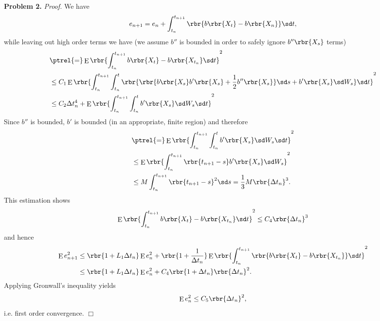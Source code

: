 \documentclass[english, nochinese]{pnote}
\DeclareMathOperator\ope{\mathrm{E}}
\begin{document}
\textbf{Problem 2.} \textit{Proof.} We have
\begin{equation}
e_{ n + 1 } = e_n + \int_{t_n}^{t_{ n + 1 }} \rbr{ b \rbr{X_t} - b \rbr{X_n} } \sd t,
\end{equation}
while leaving out high order terms we have (we assume $b''$ is bounded in order to safely ignore $ b'' \rbr{X_s} $ terms)
\begin{equation}
\begin{split}
&\ptrel{=} \ope \rbr{ \int_{t_n}^{t_{ n + 1 }} b \rbr{X_t} - b \rbr{X_{t_n}} \sd t }^2 \\
&\le C_1 \ope \rbr{ \int_{t_n}^{t_{ n + 1 }} \int_{t_n}^t \rbr{ \rbr{ b \rbr{X_s} b' \rbr{X_s} + \frac{1}{2} b'' \rbr{X_s} } \sd s + b' \rbr{X_s} \sd W_s } \sd t }^2 \\
&\le C_2 \Delta t_n^4 + \ope \rbr{ \int_{t_n}^{t_{ n + 1 }} \int_{t_n}^t b' \rbr{X_s} \sd W_s \sd t }^2
\end{split}
\end{equation}
Since $b''$ is bounded, $b'$ is bounded (in an appropriate, finite region) and therefore
\begin{equation}
\begin{split}
&\ptrel{=} \ope \rbr{ \int_{t_n}^{t_{ n + 1 }} \int_{t_n}^t b' \rbr{X_s} \sd W_s \sd t }^2 \\
&\le \ope \rbr{ \int_{t_n}^{t_{ n + 1 }} \rbr{ t_{ n + 1 } - s } b' \rbr{X_s} \sd W_s }^2 \\
&\le M \int_{t_n}^{t_{ n + 1 }} \rbr{ t_{ n + 1 } - s }^2 \sd s = \frac{1}{3} M \rbr{ \Delta t_n }^3.
\end{split}
\end{equation}
This estimation shows
\begin{equation}
\ope \rbr{ \int_{t_n}^{t_{ n + 1 }} b \rbr{X_t} - b \rbr{X_{t_n}} \sd t }^2 \le C_4 \rbr{ \Delta t_n }^3
\end{equation}
and hence
\begin{equation}
\begin{split}
\ope e_{ n + 1 }^2 &\le \rbr{ 1 + L_1 \Delta t_n } \ope e_n^2 + \rbr{ 1 + \frac{1}{ \Delta t_n } } \ope \rbr{ \int_{t_n}^{t_{ n + 1 }} \rbr{ b \rbr{X_t} - b \rbr{X_{t_n}} } \sd t }^2 \\
&\le \rbr{ 1 + L_1 \Delta t_n } \ope e_n^2 + C_4 \rbr{ 1 + \Delta t_n } \rbr{ \Delta t_n }^2.
\end{split}
\end{equation}
Applying Gronwall’s inequality yields
\begin{equation}
\ope e_n^2 \le C_5 \rbr{ \Delta t_n }^2,
\end{equation}
i.e. first order convergence.
\hfill$\Box$
\end{document}
